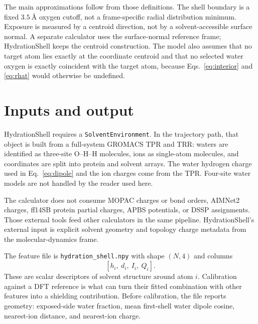 \documentclass[11pt]{article}
\begin{document}
The main approximations follow from those definitions. The shell boundary is a
fixed \(\SI{3.5}{\angstrom}\) oxygen cutoff, not a frame-specific radial
distribution minimum. Exposure is measured by a centroid direction, not by a
solvent-accessible surface normal. A separate calculator uses the surface-normal
reference frame; HydrationShell keeps the centroid construction. The model also
assumes that no target atom lies exactly at the coordinate centroid and that no
selected water oxygen is exactly coincident with the target atom, because
Eqs.~\eqref{eq:interior} and \eqref{eq:rhat} would otherwise be undefined.

\section{Inputs and output}

HydrationShell requires a \texttt{SolventEnvironment}. In the trajectory path,
that object is built from a full-system GROMACS TPR and TRR: waters are
identified as three-site O--H--H molecules, ions as single-atom molecules, and
coordinates are split into protein and solvent arrays. The water hydrogen charge
used in Eq.~\eqref{eq:dipole} and the ion charges come from the TPR. Four-site
water models are not handled by the reader used here.

The calculator does not consume MOPAC charges or bond orders, AIMNet2 charges,
ff14SB protein partial charges, APBS potentials, or DSSP assignments. Those
external tools feed other calculators in the same pipeline. HydrationShell's
external input is explicit solvent geometry and topology charge metadata from
the molecular-dynamics frame.

The feature file is \texttt{hydration\_shell.npy} with shape \((N,4)\) and
columns
\[
  [h_i,\ d_i,\ I_i,\ Q_i].
\]
These are scalar descriptors of solvent structure around atom \(i\). Calibration
against a DFT reference is what can turn their fitted combination with other
features into a shielding contribution. Before calibration, the file reports
geometry: exposed-side water fraction, mean first-shell water dipole cosine,
nearest-ion distance, and nearest-ion charge.
\end{document}
